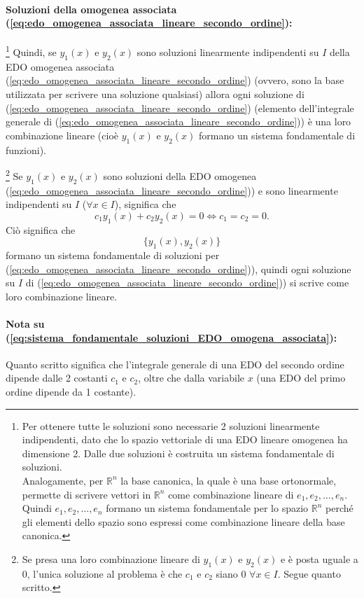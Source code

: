 \paragraph{Soluzioni della omogenea associata (\ref{eq:edo_omogenea_associata_lineare_secondo_ordine}): }\footnote{Per ottenere tutte le soluzioni sono necessarie 2 soluzioni linearmente indipendenti, dato che lo spazio vettoriale di una EDO lineare omogenea ha dimensione 2. Dalle due soluzioni è costruita un sistema fondamentale di soluzioni.\\
Analogamente, per $\mathbb R^n$ la base canonica, la quale è una \gls{base ortonormale}, permette di scrivere vettori in $\mathbb R^n$ come combinazione lineare di $e_1,e_2,\hdots, e_n$. Quindi $e_1,e_2,\hdots, e_n$ formano un sistema fondamentale per lo spazio $\mathbb R^n$ perché gli elementi dello spazio sono espressi come combinazione lineare della base canonica.} Quindi, se $y_1(x)$ e $y_2(x)$ sono soluzioni linearmente indipendenti su $I$ della EDO omogenea associata (\ref{eq:edo_omogenea_associata_lineare_secondo_ordine}) (ovvero, sono la base utilizzata per scrivere una soluzione qualsiasi) allora ogni soluzione di (\ref{eq:edo_omogenea_associata_lineare_secondo_ordine}) (elemento dell'integrale generale di (\ref{eq:edo_omogenea_associata_lineare_secondo_ordine})) è una loro combinazione lineare (cioè $y_1(x)$ e $y_2(x)$ formano un sistema fondamentale di funzioni).

\footnote{Se presa una loro combinazione lineare di $y_1(x)$ e $y_2(x)$ e è posta uguale a 0, l'unica soluzione al problema è che $c_1$ e $c_2$ siano 0 $\forall x\in I$. Segue quanto scritto.} Se $y_1(x)$ e $y_2(x)$ sono soluzioni della EDO omogenea (\ref{eq:edo_omogenea_associata_lineare_secondo_ordine})) e sono linearmente indipendenti su $I$ ($\forall x\in I$), significa che
\begin{equation*}
    c_1 y_1(x) + c_2 y_2(x) = 0 \iff c_1=c_2=0.
\end{equation*}
Ciò significa che
\begin{equation}\label{eq:sistema_fondamentale_soluzioni_EDO_omogena_associata}
    \{y_1(x), y_2(x)\}
\end{equation}
formano un sistema fondamentale di soluzioni per (\ref{eq:edo_omogenea_associata_lineare_secondo_ordine})), quindi ogni soluzione su $I$ di (\ref{eq:edo_omogenea_associata_lineare_secondo_ordine})) si scrive come loro combinazione lineare.

\paragraph{Nota su (\ref{eq:sistema_fondamentale_soluzioni_EDO_omogena_associata}):} Quanto scritto significa che l'integrale generale di una EDO del secondo ordine dipende dalle 2 costanti $c_1$ e $c_2$, oltre che dalla variabile $x$ (una EDO del primo ordine dipende da 1 costante).

